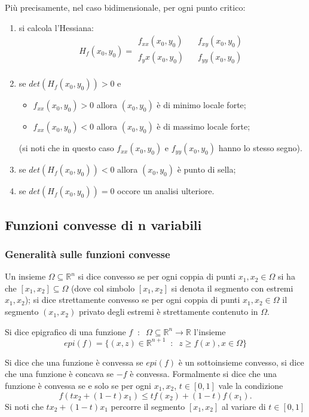 Più precisamente, nel caso bidimensionale, per ogni punto critico:
\begin{enumerate}
    \item si calcola l'Hessiana:
        \[
            H_f(x_0, y_0) = \begin{matrix}
                f_{xx}(x_0,y_0) \;\;\; & f_{xy}(x_0,y_0)\\
                f_yx(x_0,y_0) \;\;\; & f_{yy}(x_0,y_0)\\
            \end{matrix}
        \]
    \item se $det(H_f(x_0, y_0)) > 0$ e
        \begin{itemize}
            \item $f_{xx}(x_0,y_0)>0$ allora $(x_0, y_0)$ è di minimo locale forte;
            \item $f_{xx}(x_0,y_0)<0$ allora $(x_0, y_0)$ è di massimo locale forte;
        \end{itemize}
        (si noti che in questo caso $f_{xx}(x_0,y_0)$ e $f_{yy}(x_0,y_0)$ hanno lo stesso segno).
    \item se $det(H_f(x_0, y_0)) < 0$ allora $(x_0, y_0)$ è punto di sella;
    \item se $det(H_f(x_0, y_0)) = 0$ occore un analisi ulteriore. 
\end{enumerate}
\subsection*{Funzioni convesse di n variabili}
\subsubsection*{Generalità sulle funzioni convesse}
Un insieme $\Omega \subseteq \mathbb{R}^n$ si dice convesso se per ogni coppia di punti $x_1, x_2 \in \Omega$ si ha che $[x_1,x_2]\subseteq \Omega$ (dove col simbolo $[x_1,x_2]$ si denota il segmento con estremi $x_1,x_2$); si dice strettamente convesso se per ogni coppia di punti $x_1,x_2 \in \Omega$ il segmento $(x_1,x_2)$ privato degli estremi è strettamente contenuto in $\Omega$.\newline

Si dice epigrafico di una funzione $f \;\;:\;\; \Omega \subseteq \mathbb{R}^n \rightarrow  \mathbb{R}$ l'insieme
\[
    epi(f)=\{(x,z) \in \mathbb{R}^{n+1} \;\;:\;\; z\geq f(x), x \in\Omega\}
\]
\newline

Si dice che una funzione è convessa se $epi(f)$ è un sottoinsieme convesso, si dice che una funzione è concava se $-f$ è convessa.\newline
Formalmente si dice che una funzione è convessa se e solo se per ogni $x_1,x_2$, $t \in [0,1]$ vale la condizione
\[
    f(tx_2 + (1-t)x_1) \leq tf(x_2) + (1-t)f(x_1).
\]
Si noti che $tx_2 + (1-t)x_1$ percorre il segmento $[x_1,x_2]$ al variare di $t \in[0,1]$\newline

